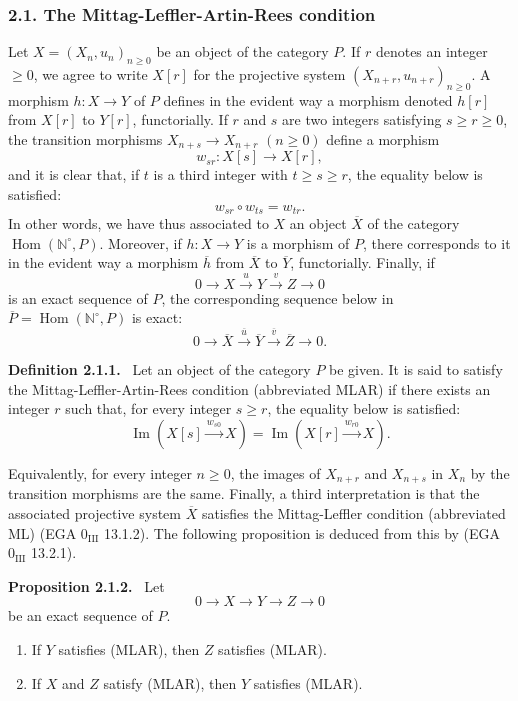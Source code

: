 \documentclass[11pt]{article}
\providecommand{\NN}{\mathbb{N}}
\newenvironment{statement}[1]{\par\medskip\noindent\textbf{#1.}\ }{\par\medskip}
\DeclareMathOperator{\Hom}{Hom}
\providecommand{\Hom}{\operatorname{Hom}}
\providecommand{\NN}{\mathbb N}
\providecommand{\Im}{\operatorname{Im}}
\renewcommand{\Im}{\operatorname{Im}}
\providecommand{\Im}{\operatorname{Im}}
\providecommand{\Hom}{\operatorname{Hom}}
\begin{document}
\subsubsection*{2.1. The Mittag-Leffler-Artin-Rees condition}
Let $X=(X_n,u_n)_{n\ge0}$ be an object of the category $P$. If $r$ denotes an integer $\ge0$, we agree to write $X[r]$ for the projective system $(X_{n+r},u_{n+r})_{n\ge0}$. A morphism $h:X\to Y$ of $P$ defines in the evident way a morphism denoted $h[r]$ from $X[r]$ to $Y[r]$, functorially. If $r$ and $s$ are two integers satisfying $s\ge r\ge0$, the transition morphisms $X_{n+s}\to X_{n+r}$ $(n\ge0)$ define a morphism
\[
w_{sr}:X[s]\longrightarrow X[r],
\]
and it is clear that, if $t$ is a third integer with $t\ge s\ge r$, the equality below is satisfied:
\[
w_{sr}\circ w_{ts}=w_{tr}.
\]
In other words, we have thus associated to $X$ an object $\overline X$ of the category $\Hom(\NN^\circ,P)$. Moreover, if $h:X\to Y$ is a morphism of $P$, there corresponds to it in the evident way a morphism $\overline h$ from $\overline X$ to $\overline Y$, functorially. Finally, if
\[
0\longrightarrow X\stackrel{u}{\longrightarrow}Y\stackrel{v}{\longrightarrow}Z\longrightarrow0
\]
is an exact sequence of $P$, the corresponding sequence below in $\overline P=\Hom(\NN^\circ,P)$ is exact:
\[
0\longrightarrow\overline X\stackrel{\overline u}{\longrightarrow}\overline Y\stackrel{\overline v}{\longrightarrow}\overline Z\longrightarrow0.
\]

\begin{statement}{Definition 2.1.1}
Let an object of the category $P$ be given. It is said to satisfy the Mittag-Leffler-Artin-Rees condition (abbreviated MLAR) if there exists an integer $r$ such that, for every integer $s\ge r$, the equality below is satisfied:
\[
\Im(X[s]\xrightarrow{w_{s0}}X)=\Im(X[r]\xrightarrow{w_{r0}}X).
\]
\end{statement}
Equivalently, for every integer $n\ge0$, the images of $X_{n+r}$ and $X_{n+s}$ in $X_n$ by the transition morphisms are the same. Finally, a third interpretation is that the associated projective system $\overline X$ satisfies the Mittag-Leffler condition (abbreviated ML) (EGA $0_{\mathrm{III}}$ 13.1.2). The following proposition is deduced from this by (EGA $0_{\mathrm{III}}$ 13.2.1).

\begin{statement}{Proposition 2.1.2}
Let
\[
0\longrightarrow X\longrightarrow Y\longrightarrow Z\longrightarrow0
\]
be an exact sequence of $P$.
\begin{enumerate}[label=(\roman*)]
\item If $Y$ satisfies (MLAR), then $Z$ satisfies (MLAR).
\item If $X$ and $Z$ satisfy (MLAR), then $Y$ satisfies (MLAR).
\end{enumerate}
\end{statement}
\end{document}
